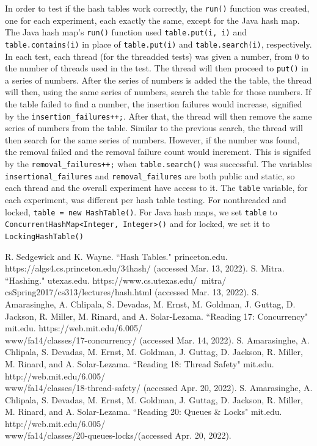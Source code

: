 \documentclass[conference]{IEEEtran}
\begin{document}
In order to test if the hash tables work correctly, the \verb|run()| function was created, one for each experiment, each exactly the same, except for the Java hash map.
The Java hash map's \verb|run()| function used \verb|table.put(i, i)| and \verb|table.contains(i)| in place of \verb|table.put(i)| and \verb|table.search(i)|, respectively. 
In each test, each thread (for the threadded tests) was given a number, from 0 to the number of threads used in the test. The thread will then proceed to \verb|put()| in a series of numbers.
After the series of numbers is added the the table, the thread will then, using the same series of numbers, search the table for those numbers.
If the table failed to find a number, the insertion failures would increase, signified by the \verb|insertion_failures++;|. After that, the thread will then remove the same series of numbers from the table.
Similar to the previous search, the thread will then search for the same series of numbers. However, if the number was found, the removal failed and the removal failure count would increment.
This is signifed by the \verb|removal_failures++;| when \verb|table.search()| was successful.
The variables \verb|insertional_failures| and \verb|removal_failures| are both public and static, so each thread and the overall experiment have access to it. 
The \verb|table| variable, for each experiment, was different per hash table testing. For nonthreaded and locked, \verb|table = new HashTable()|.
For Java hash maps, we set \verb|table| to \verb|ConcurrentHashMap<Integer, Integer>()| and for locked, we set it to \verb|LockingHashTable()|

\begin{thebibliography}{00}
 R. Sedgewick and K. Wayne. ``Hash Tables." princeton.edu. \\https://algs4.cs.princeton.edu/34hash/ (accessed Mar. 13, 2022).
 S. Mitra. ``Hashing." utexas.edu. https://www.cs.utexas.edu/~mitra/\\csSpring2017/cs313/lectures/hash.html (accessed Mar. 13, 2022).
 S. Amarasinghe, A. Chlipala, S. Devadas, M. Ernst, M. Goldman, J. Guttag, D. Jackson, R. Miller, M. Rinard, and A. Solar-Lezama. ``Reading 17: Concurrency"
mit.edu. https://web.mit.edu/6.005/\\www/fa14/classes/17-concurrency/ (accessed Mar. 14, 2022).
 S. Amarasinghe, A. Chlipala, S. Devadas, M. Ernst, M. Goldman, J. Guttag, D. Jackson, R. Miller, M. Rinard, and A. Solar-Lezama. ``Reading 18: Thread Safety"
mit.edu. http://web.mit.edu/6.005/\\www/fa14/classes/18-thread-safety/ (accessed Apr. 20, 2022).
 S. Amarasinghe, A. Chlipala, S. Devadas, M. Ernst, M. Goldman, J. Guttag, D. Jackson, R. Miller, M. Rinard, and A. Solar-Lezama. ``Reading 20: Queues \& Locks"
mit.edu. http://web.mit.edu/6.005/\\www/fa14/classes/20-queues-locks/(accessed Apr. 20, 2022).
\end{thebibliography}
\end{document}
